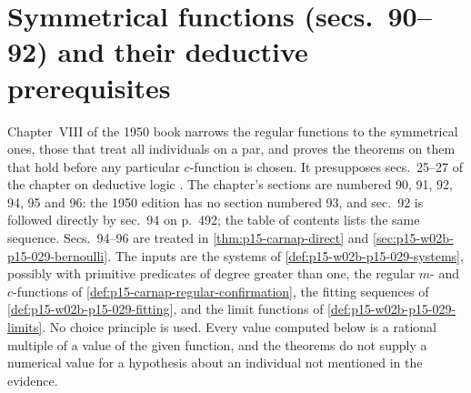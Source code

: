 \section{Symmetrical functions (secs.~90--92) and their deductive prerequisites}
\label{sec:p15-w02b-p15-029-symmetrical}

Chapter~VIII of the 1950 book narrows the regular functions to the
symmetrical ones, those that treat all individuals on a par, and proves
the theorems on them that hold before any particular \(c\)-function is
chosen. It presupposes secs.~25--27 of the chapter on deductive logic
\cite[sec.~90, pp.~483--484]{Carnap1950Probability}. The chapter's
sections are numbered 90, 91, 92, 94, 95 and 96: the 1950 edition has
no section numbered 93, and sec.~92 is followed directly by sec.~94 on
p.~492; the table of contents lists the same sequence. Secs.~94--96
are treated in \cref{thm:p15-carnap-direct} and
\cref{sec:p15-w02b-p15-029-bernoulli}. The inputs are the systems of
\cref{def:p15-w02b-p15-029-systems}, possibly with primitive predicates
of degree greater than one, the regular \(m\)- and \(c\)-functions of
\cref{def:p15-carnap-regular-confirmation}, the fitting sequences of
\cref{def:p15-w02b-p15-029-fitting}, and the limit functions of
\cref{def:p15-w02b-p15-029-limits}. No choice principle is used.
Every value computed below is a rational multiple of a value of the
given function, and the theorems do not supply a numerical value for a
hypothesis about an individual not mentioned in the evidence.


